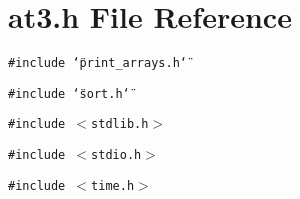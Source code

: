 \section{at3.h File Reference}
\label{at3_8h}
{\tt \#include \char`\"{}print\_\-arrays.h\char`\"{}}\par
{\tt \#include \char`\"{}sort.h\char`\"{}}\par
{\tt \#include $<$stdlib.h$>$}\par
{\tt \#include $<$stdio.h$>$}\par
{\tt \#include $<$time.h$>$}\par

